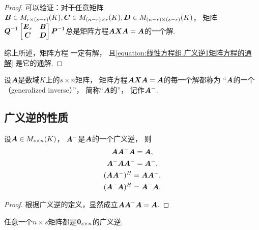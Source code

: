 \begin{theorem}[广义逆存在定理]
\begin{proof}
可以验证：对于任意矩阵\(
	\boldsymbol{B} \in M_{r \times (s-r)}(K),
	\boldsymbol{C} \in M_{(n-r) \times r}(K),
	\boldsymbol{D} \in M_{(n-r) \times (s-r)}(K)
\)，
矩阵\(
	\boldsymbol{Q}^{-1}
	\begin{bmatrix}
		\boldsymbol{E}_r & \boldsymbol{B} \\
		\boldsymbol{C} & \boldsymbol{D}
	\end{bmatrix}
	\boldsymbol{P}^{-1}
\)总是矩阵方程\(\boldsymbol{A} \boldsymbol{X} \boldsymbol{A} = \boldsymbol{A}\)的一个解.

综上所述，矩阵方程  一定有解，
且\cref{equation:线性方程组.广义逆1矩阵方程的通解} 是它的通解.
\end{proof}
\end{theorem}

\begin{definition}
设\(\boldsymbol{A}\)是数域\(K\)上的\(s \times n\)矩阵，
矩阵方程\(\boldsymbol{A} \boldsymbol{X} \boldsymbol{A} = \boldsymbol{A}\)的每一个解都称为
“\(\boldsymbol{A}\)的一个（generalized inverse）”，
简称“\(\boldsymbol{A}\)的”，
记作\(\boldsymbol{A}^-\).
\end{definition}

\subsection{广义逆的性质}
\begin{property}\label{theorem:线性方程组.广义逆的性质1}
设\(\boldsymbol{A} \in M_{s \times n}(K)\)，
\(\boldsymbol{A}^-\)是\(\boldsymbol{A}\)的一个广义逆，
则\begin{gather}
	\boldsymbol{A} \boldsymbol{A}^-\boldsymbol{A} = \boldsymbol{A}, \\
	\boldsymbol{A}^-\boldsymbol{A} \boldsymbol{A}^- = \boldsymbol{A}^-, \\
	(\boldsymbol{A} \boldsymbol{A}^-)^H = \boldsymbol{A} \boldsymbol{A}^-, \\
	(\boldsymbol{A}^-\boldsymbol{A})^H = \boldsymbol{A}^-\boldsymbol{A}.
\end{gather}
\begin{proof}
根据广义逆的定义，显然成立\(\boldsymbol{A} \boldsymbol{A}^-\boldsymbol{A} = \boldsymbol{A}\).
\end{proof}
\end{property}

\begin{property}\label{theorem:线性方程组.广义逆的性质2}
任意一个\(n \times s\)矩阵都是\(\boldsymbol0_{s \times n}\)的广义逆.
\end{property}

